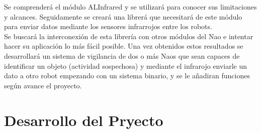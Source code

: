 \documentclass[letterpaper]{article}
\begin{document}
Se comprenderá el módulo ALInfrared y se utilizará para conocer sus limitaciones y alcances. Seguidamente se creará una librerá que necesitará de este módulo para enviar datos mediante los sensores infrarrojos entre los robots.
\\ Se buscará la interconexión de esta librería con otros módulos del Nao e intentar hacer su aplicación lo más fácil posible. Una vez obtenidos estos resultados se desarrollará un sistema de vigilancia de dos o más Naos que sean capaces de identificar un objeto (actividad sospechosa) y mediante el infrarojo enviarle un dato a otro robot empezando con un sistema binario, y se le añadiran funciones según avance el proyecto.


\section{Desarrollo del Pryecto}
\end{document}
